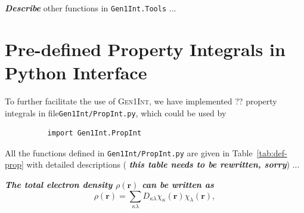 \documentclass[a4paper,11pt,twoside,openright]{book}
\newcommand{\fixme}[1]{\textbf{\textit{\color{red} #1}}}
\begin{document}
\fixme{Describe} other functions in \verb|Gen1Int.Tools| ...

\section{Pre-defined Property Integrals in Python Interface}
\label{sect:python-property}

To further facilitate the use of \textsc{Gen1Int}, we have implemented ?? property integrals
in file\linebreak \verb|Gen1Int/PropInt.py|, which could be used by
\begin{verbatim}
          import Gen1Int.PropInt
\end{verbatim}

All the functions defined in \verb|Gen1Int/PropInt.py| are given in Table~\ref{tab:def-prop} with detailed
descriptions (\fixme{this table needs to be rewritten, sorry}) ...

\fixme{The total electron density $\rho(\boldsymbol{r})$ can be written as
\begin{equation}
  \rho(\boldsymbol{r})=\sum_{\kappa\lambda}D_{\kappa\lambda}\chi_{\kappa}(\boldsymbol{r})\chi_{\lambda}(\boldsymbol{r}),
\end{equation}}

\clearpage
\end{document}
